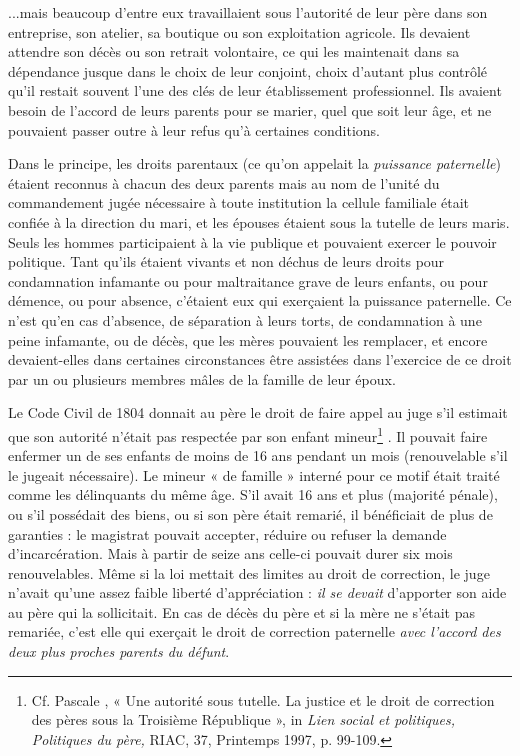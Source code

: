  ...mais beaucoup d'entre eux travaillaient sous l'autorité de leur père dans son entreprise, son atelier, sa boutique ou son exploitation agricole. Ils devaient attendre son décès ou son retrait volontaire, ce qui les maintenait dans sa dépendance jusque dans le choix de leur conjoint, choix d'autant plus contrôlé qu'il restait souvent l'une des clés de leur établissement professionnel. Ils avaient besoin de l'accord de leurs parents pour se marier, quel que soit leur âge, et ne pouvaient passer outre à leur refus qu'à certaines conditions. 

 Dans le principe, les droits parentaux (ce qu'on appelait la \emph{puissance paternelle}) étaient reconnus à chacun des deux parents mais au nom de l'unité du commandement jugée nécessaire à toute institution la cellule familiale était confiée à la direction du mari, et les épouses étaient sous la tutelle de leurs maris. Seuls les hommes participaient à la vie publique et pouvaient exercer le pouvoir politique. Tant qu'ils étaient vivants et non déchus de leurs droits pour condamnation infamante ou pour maltraitance grave de leurs enfants, ou pour démence, ou pour absence, c'étaient eux qui exerçaient la puissance paternelle. Ce n'est qu'en cas d'absence, de séparation à leurs torts, de condamnation à une peine infamante, ou de décès, que les mères pouvaient les remplacer, et encore devaient-elles dans certaines circonstances être assistées dans l'exercice de ce droit par un ou plusieurs membres mâles de la famille de leur époux. 
 
 
 Le Code Civil de 1804 donnait au père le droit de faire appel au juge s'il estimait que son autorité n'était pas respectée par son enfant mineur\footnote{Cf. Pascale , « Une autorité sous tutelle. La justice et le droit de correction des pères sous la Troisième République », in \emph{Lien social et politiques, Politiques du père,} RIAC, 37, Printemps 1997, p. 99-109.}%
. Il pouvait faire enfermer un de ses enfants de moins de 16 ans pendant un mois (renouvelable s'il le jugeait nécessaire). Le mineur « de famille » interné pour ce motif était traité comme les délinquants du même âge. S'il avait 16 ans et plus (majorité pénale), ou s'il possédait des biens, ou si son père était remarié, il bénéficiait de plus de garanties : le magistrat pouvait accepter, réduire ou refuser la demande d'incarcération. Mais à partir de seize ans celle-ci pouvait durer six mois renouvelables. Même si la loi mettait des limites au droit de correction, le juge n'avait qu'une assez faible liberté d'appréciation : \emph{il se devait} d'apporter son aide au père qui la sollicitait. En cas de décès du père et si la mère ne s'était pas remariée, c'est elle qui exerçait le droit de correction paternelle \emph{avec l'accord des deux plus proches parents du défunt}. 

